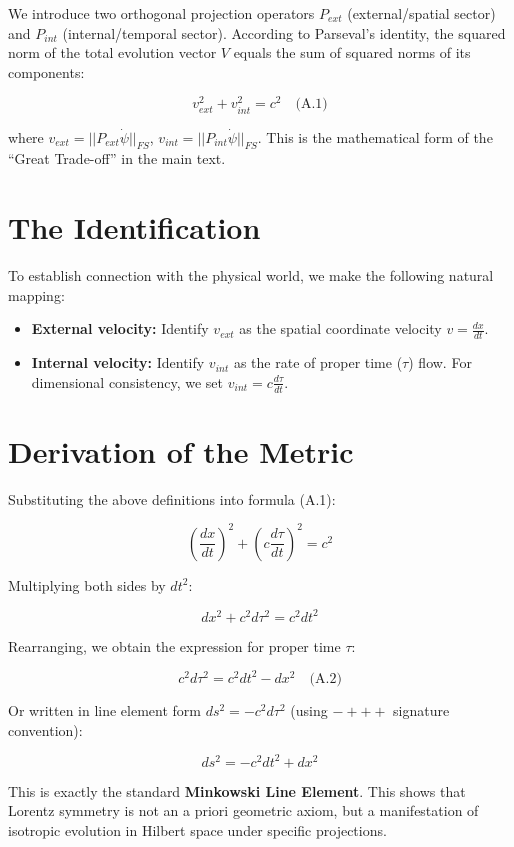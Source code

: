 \documentclass[11pt,a4paper,twoside]{book}
\begin{document}
We introduce two orthogonal projection operators $P_{ext}$ (external/spatial sector) and $P_{int}$ (internal/temporal sector). According to Parseval's identity, the squared norm of the total evolution vector $V$ equals the sum of squared norms of its components:

$$v_{ext}^2 + v_{int}^2 = c^2 \quad \text{(A.1)}$$

where $v_{ext} = ||P_{ext}\dot{\psi}||_{FS}$, $v_{int} = ||P_{int}\dot{\psi}||_{FS}$. This is the mathematical form of the ``Great Trade-off'' in the main text.

\section{The Identification}

To establish connection with the physical world, we make the following natural mapping:

\begin{itemize}
\item \textbf{External velocity:} Identify $v_{ext}$ as the spatial coordinate velocity $v = \frac{dx}{dt}$.

\item \textbf{Internal velocity:} Identify $v_{int}$ as the rate of proper time ($\tau$) flow. For dimensional consistency, we set $v_{int} = c \frac{d\tau}{dt}$.
\end{itemize}

\section{Derivation of the Metric}

Substituting the above definitions into formula (A.1):

$$(\frac{dx}{dt})^2 + (c \frac{d\tau}{dt})^2 = c^2$$

Multiplying both sides by $dt^2$:

$$dx^2 + c^2 d\tau^2 = c^2 dt^2$$

Rearranging, we obtain the expression for proper time $\tau$:

$$c^2 d\tau^2 = c^2 dt^2 - dx^2 \quad \text{(A.2)}$$

Or written in line element form $ds^2 = -c^2 d\tau^2$ (using $-+++$ signature convention):

$$ds^2 = -c^2 dt^2 + dx^2$$

This is exactly the standard \textbf{Minkowski Line Element}. This shows that Lorentz symmetry is not an a priori geometric axiom, but a manifestation of isotropic evolution in Hilbert space under specific projections.
\end{document}
